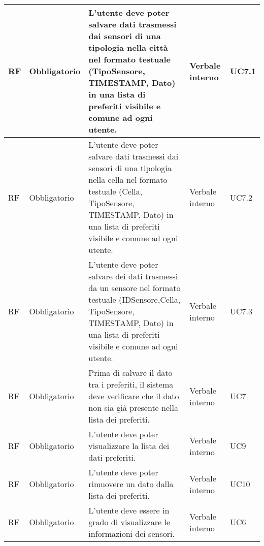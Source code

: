 \begin{longtable}{|C{1cm}|C{2cm}|>{\raggedright}m{5cm}|C{2cm}|C{1.5cm}|}
    \hline
     RF & Obbligatorio        & L'utente deve poter salvare dati trasmessi dai sensori di una tipologia nella città nel formato testuale (TipoSensore, TIMESTAMP, Dato) in una lista di preferiti visibile e comune ad ogni utente.                                & Verbale interno & UC7.1               \\
    \hline
     RF & Obbligatorio        & L'utente deve poter salvare dati trasmessi dai  sensori di una tipologia nella cella nel formato testuale (Cella, TipoSensore, TIMESTAMP, Dato) in una lista di preferiti visibile e comune ad ogni utente.                         & Verbale interno & UC7.2               \\
    \hline
     RF & Obbligatorio        & L'utente deve poter salvare dei dati trasmessi da un sensore nel formato testuale (IDSensore,Cella, TipoSensore, TIMESTAMP, Dato) in una lista di preferiti visibile e comune ad ogni utente.                                       & Verbale interno & UC7.3               \\
    \hline
     RF & Obbligatorio        & Prima di salvare il dato tra i preferiti, il sistema deve verificare che il dato non sia già presente nella lista dei preferiti.                                                                                                   & Verbale interno      & UC7               \\
    \hline
     RF & Obbligatorio        & L'utente deve poter visualizzare la lista dei dati preferiti.                                                                                                                                                                       & Verbale interno & UC9                 \\
    \hline
     RF & Obbligatorio        & L'utente deve poter rimuovere un dato dalla lista dei preferiti.                                                                                                                                                                    & Verbale interno & UC10               \\
    \hline
     RF & Obbligatorio        & L'utente deve essere in grado di visualizzare le informazioni dei sensori.                                                                                                                                                           & Verbale interno      & UC6               \\

\end{longtable}
